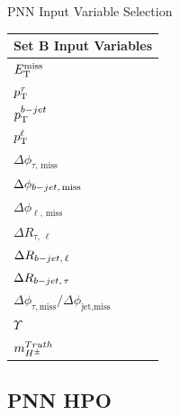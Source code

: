 \documentclass[aspectratio=169,xcolor=table]{beamer}
\begin{document}
\begin{frame}[t]{PNN Input Variable Selection}
\begin{table}[!thp]
        \begin{subtable}[c]{0.25\textwidth}
          \centering
          \begin{tabular}{| l |}
            \hline
            \textbf{Set B Input Variables} \\
            \hline \hline
            $E_\text{T}^\text{miss}$  \\
            $p_{\text{T}}^{\tau}$  \\
            $p_{\text{T}}^{b-jet}$  \\
            $p_{\text{T}}^{\ell}$  \\
            $\Delta \phi_{\tau,\,\text{miss}}$  \\
            $\Delta \phi_{b-jet,\,\text{miss}}$  \\
            $\Delta \phi_{\ell,\,\text{miss}}$  \\
            $\Delta R_{\tau,\,\ell}$ \\
            $\Delta R_{b-jet,\,\ell}$ \\
            $\Delta R_{b-jet,\,\tau}$ \\
            $\Delta \phi_{\tau, \text{miss}} / \Delta \phi_{\text{jet}, \text{miss}}$  \\
            $\Upsilon$ \\
            $m_{H^{\pm}}^{Truth}$ \\ \hline
          \end{tabular}
        \end{subtable}
      \end{table}
    \end{frame}

  \subsection{ PNN HPO }
\end{document}
